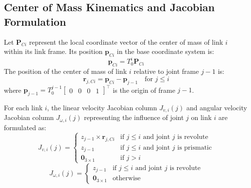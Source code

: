 \documentclass[journal]{IEEEtran}
\begin{document}
\subsection{Center of Mass Kinematics and Jacobian Formulation}
Let $\textbf{P}_{Ci}$ represent the local coordinate vector of the center of mass of link $i$ within its link frame. Its position $\textbf{p}_{Ci}$ in the base coordinate system is:
\begin{equation}
    \textbf{p}_{Ci} = T_0^i \textbf{P}_{Ci}
\end{equation}
The position of the center of mass of link $i$ relative to joint frame $j-1$ is:
\begin{equation}
    \textbf{r}_{j, Ci} = \textbf{p}_{Ci} - \textbf{p}_{j-1} \quad \text{for } j \le i
\end{equation}
where $\textbf{p}_{j-1} = T_0^{j-1} \begin{bmatrix} 0 & 0 & 0 & 1 \end{bmatrix}^\top$ is the origin of frame $j-1$.

For each link $i$, the linear velocity Jacobian column $J_{v,i}(j)$ and angular velocity Jacobian column $J_{\omega,i}(j)$ representing the influence of joint $j$ on link $i$ are formulated as:
\begin{equation}
    J_{v,i}(j) = \begin{cases}
        z_{j-1} \times \textbf{r}_{j, Ci} & \text{if } j \le i \text{ and joint } j \text{ is revolute} \\
        z_{j-1} & \text{if } j \le i \text{ and joint } j \text{ is prismatic} \\
        \textbf{0}_{3 \times 1} & \text{if } j > i
    \end{cases}
\end{equation}
\begin{equation}
    J_{\omega,i}(j) = \begin{cases}
        z_{j-1} & \text{if } j \le i \text{ and joint } j \text{ is revolute} \\
        \textbf{0}_{3 \times 1} & \text{otherwise}
    \end{cases}
\end{equation}
\end{document}
